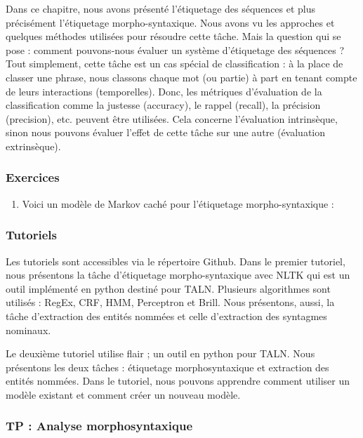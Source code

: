 \documentclass{KodeBook}
\begin{document}
Dans ce chapitre, nous avons présenté l'étiquetage des séquences et plus précisément l'étiquetage morpho-syntaxique. 
Nous avons vu les approches et quelques méthodes utilisées pour résoudre cette tâche. 
Mais la question qui se pose : comment pouvons-nous évaluer un système d'étiquetage des séquences ? 
Tout simplement, cette tâche est un cas spécial de classification : à la place de classer une phrase, nous classons chaque mot (ou partie) à part en tenant compte de leurs interactions (temporelles). 
Donc, les métriques d'évaluation de la classification comme la justesse (accuracy), le rappel (recall), la précision (precision), etc. peuvent être utilisées.
Cela concerne l'évaluation intrinsèque, sinon nous pouvons évaluer l'effet de cette tâche sur une autre (évaluation extrinsèque).


\subsubsection*{Exercices}

\begin{enumerate}
	\item Voici un modèle de Markov caché pour l'étiquetage morpho-syntaxique : 
	
\end{enumerate}

\subsubsection*{Tutoriels}

Les tutoriels sont accessibles via le répertoire Github.
Dans le premier tutoriel, nous présentons la tâche d'étiquetage morpho-syntaxique avec NLTK qui est un outil implémenté en python destiné pour TALN.
Plusieurs algorithmes sont utilisés : RegEx, CRF, HMM, Perceptron et Brill.
Nous présentons, aussi, la tâche d'extraction des entités nommées et celle d'extraction des syntagmes nominaux.

Le deuxième tutoriel utilise flair ; un outil en python pour TALN.
Nous présentons les deux tâches : étiquetage morphosyntaxique et extraction des entités nommées.
Dans le tutoriel, nous pouvons apprendre comment utiliser un modèle existant et comment créer un nouveau modèle.

\subsubsection*{TP : Analyse morphosyntaxique}
\end{document}
